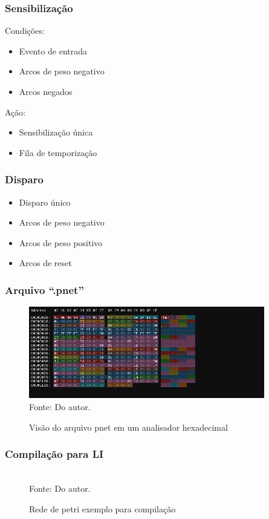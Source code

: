 \documentclass{beamer}
\newcommand{\incsvg}[2]{%
	\def\svgwidth{\columnwidth}
	\graphicspath{{#1}}
	
}
\begin{document}
\begin{frame}
\frametitle{Sensibilização}
Condições:
\begin{itemize}
	\item Evento de entrada
	\item Arcos de peso negativo
	\item Arcos negados
\end{itemize}
Ação:
\begin{itemize}
	\item Sensibilização única
	\item Fila de temporização
\end{itemize}
\end{frame}

\begin{frame}
\frametitle{Disparo}

\begin{itemize}
	\item Disparo único
	\item Arcos de peso negativo
	\item Arcos de peso positivo
	\item Arcos de reset
\end{itemize}
\end{frame}

\begin{frame}
\frametitle{Arquivo ``.pnet''}
\begin{figure}[h!]
	\centering
	\caption{Visão do arquivo pnet em um analisador hexadecimal}
	\includegraphics[height=4cm]{images/hexfile.png}
	\label{fig:hexfile}
	\footnotesize{Fonte: Do autor.}
\end{figure}
\end{frame}

\begin{frame}
\frametitle{Compilação para LI}
\begin{figure}[ht]
	\centering
	\caption{Rede de petri exemplo para compilação}
	\scriptsize
	\incsvg{images}{images/pnetcomp}\\
	\label{fig:pnetcomp}
	\footnotesize{Fonte: Do autor.}
\end{figure}
\end{frame}
\end{document}
